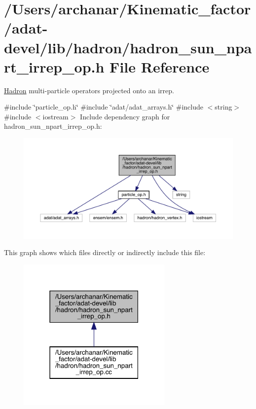 \hypertarget{adat-devel_2lib_2hadron_2hadron__sun__npart__irrep__op_8h}{}\section{/\+Users/archanar/\+Kinematic\+\_\+factor/adat-\/devel/lib/hadron/hadron\+\_\+sun\+\_\+npart\+\_\+irrep\+\_\+op.h File Reference}
\label{adat-devel_2lib_2hadron_2hadron__sun__npart__irrep__op_8h}


\mbox{\hyperlink{namespaceHadron}{Hadron}} multi-\/particle operators projected onto an irrep.  


{\ttfamily \#include \char`\"{}particle\+\_\+op.\+h\char`\"{}}\newline
{\ttfamily \#include \char`\"{}adat/adat\+\_\+arrays.\+h\char`\"{}}\newline
{\ttfamily \#include $<$string$>$}\newline
{\ttfamily \#include $<$iostream$>$}\newline
Include dependency graph for hadron\+\_\+sun\+\_\+npart\+\_\+irrep\+\_\+op.\+h\+:
\nopagebreak
\begin{figure}[H]
\begin{center}
\leavevmode
\includegraphics[width=350pt]{de/dfe/adat-devel_2lib_2hadron_2hadron__sun__npart__irrep__op_8h__incl}
\end{center}
\end{figure}
This graph shows which files directly or indirectly include this file\+:
\nopagebreak
\begin{figure}[H]
\begin{center}
\leavevmode
\includegraphics[width=214pt]{d4/df4/adat-devel_2lib_2hadron_2hadron__sun__npart__irrep__op_8h__dep__incl}
\end{center}
\end{figure}
